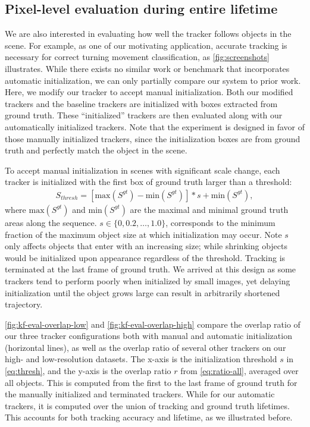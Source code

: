 \subsection{Pixel-level evaluation during entire lifetime} 
\label{subsec:tracker-eval-overall}

We are also interested in evaluating how well the tracker follows objects in the scene. For example, as one of our motivating application, accurate tracking is necessary for correct turning movement classification, as \ref{fig:screenshots} illustrates.
While there exists no similar work or benchmark that incorporates automatic initialization, we can only partially compare our system to prior work. Here, we modify our tracker to accept manual initialization. Both our modified trackers and the baseline trackers are initialized with boxes extracted from ground truth. These ``initialized'' trackers are then evaluated along with our automatically initialized trackers. Note that the experiment is designed in favor of those manually initialized trackers, since the initialization boxes are from ground truth and perfectly match the object in the scene.

To accept manual initialization in scenes with significant scale change, each tracker is initialized with the first box of ground truth larger than a threshold: 
\begin{align}
    S_{thresh}=\left[\text{max}(S^{gt})-\text{min}(S^{gt})\right]*s + \text{min}(S^{gt}),
    \label{eq:thresh}
\end{align}
where $\text{max}(S^{gt})$ and $\text{min}(S^{gt})$ are the maximal and minimal ground truth areas along the sequence. $s\in \{0, 0.2, \dots, 1.0\}$, corresponds to the minimum fraction of the maximum object size at which initialization may occur. Note $s$ only affects objects that enter with an increasing size; while shrinking objects would be initialized upon appearance regardless of the threshold. 
Tracking is terminated at the last frame of ground truth. 
We arrived at this design as some trackers tend to perform poorly when initialized by small images, yet delaying initialization until the object grows large can result in arbitrarily shortened trajectory.

\ref{fig:kf-eval-overlap-low} and \ref{fig:kf-eval-overlap-high} compare the overlap ratio of our three tracker configurations both with manual and automatic initialization (horizontal lines), as well as the overlap ratio of several other trackers on our high- and low-resolution datasets. 
The x-axis is the initialization threshold $s$ in \ref{eq:thresh}, and the y-axis is the overlap ratio $r$ from \ref{eq:ratio-all}, averaged over all objects.
This is computed from the first to the last frame of ground truth for the manually initialized and terminated trackers. While for our automatic trackers, it is computed over the union of tracking and ground truth lifetimes. This accounts for both tracking accuracy and lifetime, as we illustrated before.

